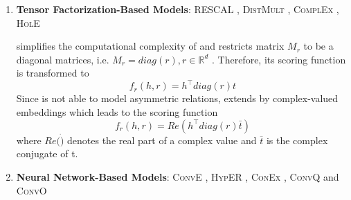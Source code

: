 \begin{enumerate}
    \item 
    \textbf{Tensor Factorization-Based Models}:
    \textsc{RESCAL} \cite{RESCAL}, \textsc{DistMult} \cite{DistMult}, \textsc{ComplEx} \cite{ComplEx}, \textsc{HolE} \cite{HolE}

    
    \distmult \cite{DistMult} simplifies the computational complexity of \rescal and restricts matrix $M_r$ to be a diagonal matrices, i.e. $M_r = diag(r), r \in \mathbb{R}^d$ \cite{electronics9050750}. 
    Therefore, its scoring function is transformed to
    \begin{equation}
        f_r(h,r) = h^{\top}diag(r)t\label{eq:distmultscoringfunction}
    \end{equation}
    Since \distmult is not able to model asymmetric relations, \complex \cite{ComplEx} extends \distmult by complex-valued embeddings \cite{electronics9050750} which leads to the scoring function
    \begin{equation}
        f_r(h,r) = Re(h^{\top}diag(r)\bar{t})
        \label{eq:complexscoringfunction}
    \end{equation}
    where $Re(\dot)$ denotes the real part of a complex value and $\bar{t}$ is the complex conjugate of t.
    
    
    \item 
    \textbf{Neural Network-Based Models}: 
    \textsc{ConvE} \cite{ConvE}, \textsc{HypER} \cite{HypER}, \textsc{ConEx} \cite{ConEx}, \textsc{ConvQ} and  \textsc{ConvO} \cite{demir2021convolutional}
\end{enumerate}